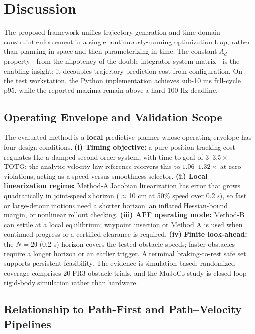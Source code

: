 \section{Discussion}\label{viii.-discussion}

The proposed framework unifies trajectory generation and time-domain
constraint enforcement in a single continuously-running optimization loop,
rather than planning in space and then parameterizing in time. The
constant-\(A_d\) property---from the nilpotency of the double-integrator
system matrix---is the enabling insight: it decouples trajectory-prediction
cost from configuration. On the test workstation, the Python implementation
achieves sub-10 ms full-cycle p95, while the reported maxima remain above a
hard 100 Hz deadline.

\subsection{Operating Envelope and Validation Scope}\label{scope-and-limitations}

The evaluated method is a \textbf{local} predictive planner whose operating
envelope has four design conditions. \textbf{(i) Timing objective:} a
pure position-tracking cost regulates like a damped second-order system,
with time-to-goal of \(3\)--\(3.5\times\) TOTG; the analytic
velocity-law reference recovers this to \(1.06\)--\(1.32\times\) at zero
violations, acting as a speed-versus-smoothness selector. \textbf{(ii)
Local linearization regime:} Method-A Jacobian linearization has error that
grows quadratically in joint-speed$\times$horizon
($\approx$10 cm at 50\% speed over 0.2 s), so fast or large-detour motions
need a shorter horizon, an inflated Hessian-bound margin, or nonlinear
rollout checking. \textbf{(iii) APF operating mode:} Method-B can settle at a
local equilibrium; waypoint insertion or Method A is used when continued
progress or a certified clearance is required. \textbf{(iv) Finite
look-ahead:} the \(N = 20\) (0.2 s) horizon covers the tested obstacle speeds;
faster obstacles require a longer horizon or an earlier trigger. A terminal
braking-to-rest safe set supports persistent feasibility. The evidence is
simulation-based: randomized coverage comprises 20 FR3 obstacle trials, and
the MuJoCo study is closed-loop rigid-body simulation rather than hardware.

\subsection{Relationship to Path-First and Path--Velocity
Pipelines}\label{relationship-to-path-first-and-pathvelocity-pipelines}

